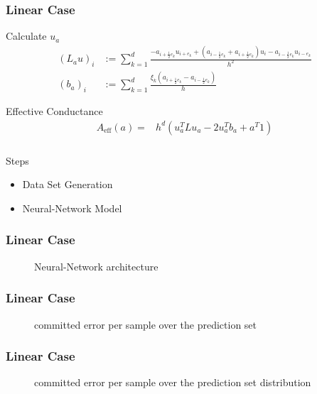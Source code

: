 \documentclass{beamer}
\begin{document}
\begin{frame}
	\frametitle{Linear Case}
	
	\begin{block}{Calculate $u_a$}	
		\begin{align*}
		(L_a u)_i &:= \sum_{k=1}^{d} \frac{-a_{i+\frac{1}{2}e_k} u_{i+e_k} + (a_{i-\frac{1}{2}e_k} + a_{i+\frac{1}{2}e_k})u_i - a_{i-\frac{1}{2}e_k} u_{i-e_k} }{h^2}\\
		(b_a)_i &:= \sum_{k=1}^{d} \frac{\xi_k (a_{i+\frac{1}{2}e_k} - a_{i-\frac{1}{2}e_k})}{h} 
		\end{align*}	
	\end{block}
	\begin{block}{Effective Conductance}	
	\begin{align*}
		A_{\mathrm{eff}}(a) = &h^d (u_a^T L
u_a - 2u^T_a b_a + a^T 1)
	\end{align*}	
\end{block}
\end{frame}

\begin{frame}
	\frametitle{}	
	\begin{block}{Steps}
		\begin{itemize}
			\item  Data Set Generation 
			\item  Neural-Network Model
		\end{itemize}	
	\end{block}
\end{frame}

\begin{frame}
	\frametitle{Linear Case}
		\begin{figure}[h!]
			{
				\centering
				\def\svgwidth{\columnwidth}
				\scalebox{1}{}
				\caption{Neural-Network architecture}
			}
		\end{figure}	
\end{frame} 


\begin{frame}
	\frametitle{Linear Case}
	\begin{figure}[h!]
		{
			\centering
			\def\svgwidth{\columnwidth}
			\scalebox{.5}{}
			\caption{committed error per sample over the prediction set}
		}
	\end{figure}	
\end{frame} 
\begin{frame}
	\frametitle{Linear Case}
	\begin{figure}[h!]
		{
			\centering
			\def\svgwidth{\columnwidth}
			\scalebox{.5}{}
			\caption{committed error per sample over the prediction set distribution}
		}
	\end{figure}	
\end{frame} 
\end{document}
